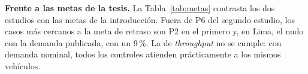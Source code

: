 
\noindent\textbf{Frente a las metas de la tesis.} La
Tabla~\ref{tab:metas} contrasta los dos estudios con las metas de la
introducción. Fuera de P6 del segundo estudio, los casos más cercanos a
la meta de retraso son P2 en el primero y, en Lima, el nudo con la
demanda publicada, con un 9\,\%. La de \textit{throughput} no se cumple:
con demanda nominal, todos los controles atienden prácticamente a los
mismos vehículos.

